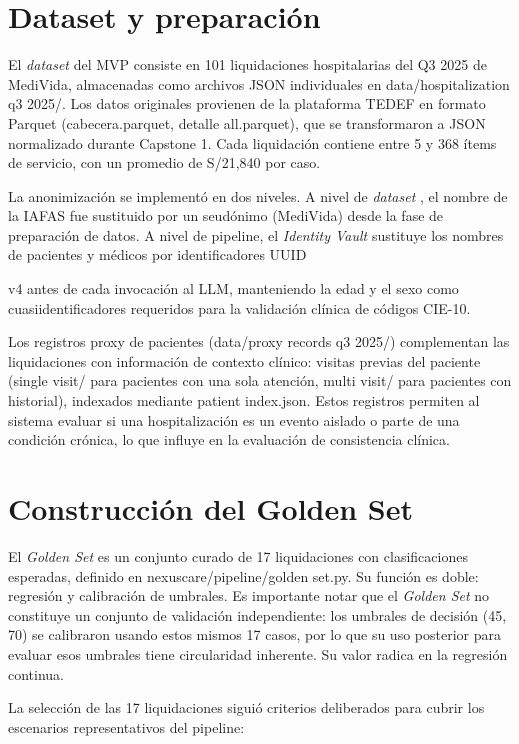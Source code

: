 \section{Dataset y preparación}

El \textit{dataset}  del MVP consiste en 101 liquidaciones hospitalarias del Q3 2025 de MediVida, almacenadas como archivos JSON individuales en data/hospitalization q3 2025/. Los datos originales provienen de la plataforma TEDEF en formato Parquet (cabecera.parquet, detalle all.parquet), que se transformaron a JSON normalizado durante Capstone 1. Cada liquidación contiene entre 5 y 368 ítems de servicio, con un promedio de S/21,840 por caso.

La anonimización se implementó en dos niveles. A nivel de \textit{dataset} , el nombre de la IAFAS fue sustituido por un seudónimo (MediVida) desde la fase de preparación de datos. A nivel de pipeline, el \textit{Identity Vault} sustituye los nombres de pacientes y médicos por identificadores UUID

v4 antes de cada invocación al LLM, manteniendo la edad y el sexo como cuasiidentificadores requeridos para la validación clínica de códigos CIE-10.

Los registros proxy de pacientes (data/proxy records q3 2025/) complementan las liquidaciones con información de contexto clínico: visitas previas del paciente (single visit/ para pacientes con una sola atención, multi visit/ para pacientes con historial), indexados mediante patient index.json. Estos registros permiten al sistema evaluar si una hospitalización es un evento aislado o parte de una condición crónica, lo que influye en la evaluación de consistencia clínica.

\section{Construcción del Golden Set}

El \textit{Golden Set} es un conjunto curado de 17 liquidaciones con clasificaciones esperadas, definido en nexuscare/pipeline/golden set.py. Su función es doble: regresión y calibración de umbrales. Es importante notar que el \textit{Golden Set} no constituye un conjunto de validación independiente: los umbrales de decisión (45, 70) se calibraron usando estos mismos 17 casos, por lo que su uso posterior para evaluar esos umbrales tiene circularidad inherente. Su valor radica en la regresión continua.

La selección de las 17 liquidaciones siguió criterios deliberados para cubrir los escenarios representativos del pipeline:

